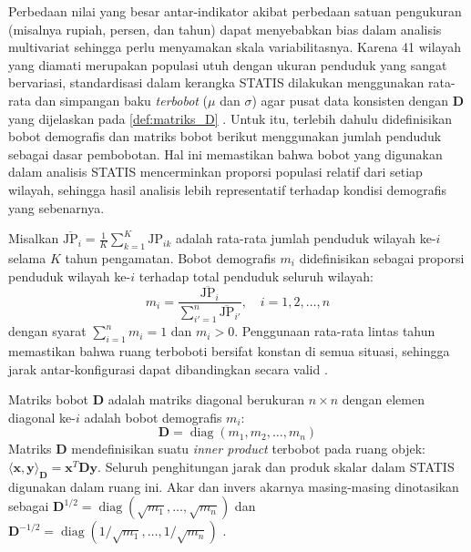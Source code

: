 Perbedaan nilai yang besar antar-indikator akibat perbedaan satuan pengukuran (misalnya rupiah, persen, dan tahun) dapat menyebabkan bias dalam analisis multivariat sehingga perlu menyamakan skala variabilitasnya. Karena 41 wilayah yang diamati merupakan populasi utuh dengan ukuran penduduk yang sangat bervariasi, standardisasi dalam kerangka STATIS dilakukan menggunakan rata-rata dan simpangan baku \textit{terbobot} ($\mu$ dan $\sigma$) agar pusat data konsisten dengan $\mathbf{D}$ yang dijelaskan pada \ref{def:matriks_D} \citep{lavit94}. Untuk itu, terlebih dahulu didefinisikan bobot demografis dan matriks bobot berikut menggunakan jumlah penduduk sebagai dasar pembobotan. Hal ini memastikan bahwa bobot yang digunakan dalam analisis STATIS mencerminkan proporsi populasi relatif dari setiap wilayah, sehingga hasil analisis lebih representatif terhadap kondisi demografis yang sebenarnya.

\begin{definition} \label{def:bobot}
  Misalkan $\overline{\mathrm{JP}}_i = \frac{1}{K}\sum_{k=1}^{K} \mathrm{JP}_{ik}$ adalah rata-rata jumlah penduduk wilayah ke-$i$ selama $K$ tahun pengamatan. Bobot demografis $m_i$ didefinisikan sebagai proporsi penduduk wilayah ke-$i$ terhadap total penduduk seluruh wilayah:
  \begin{equation} \label{eq:bobot}
    m_i = \frac{\overline{\mathrm{JP}}_i}{\displaystyle\sum_{i'=1}^{n} \overline{\mathrm{JP}}_{i'}}, \quad i = 1, 2, \ldots, n
  \end{equation}
  dengan syarat $\sum_{i=1}^{n} m_i = 1$ dan $m_i > 0$. Penggunaan rata-rata lintas tahun memastikan bahwa ruang terboboti bersifat konstan di semua situasi, sehingga jarak antar-konfigurasi dapat dibandingkan secara valid \citep{lavit94}.
\end{definition}

\begin{definition} \label{def:matriks_D}
  Matriks bobot $\mathbf{D}$ adalah matriks diagonal berukuran $n \times n$ dengan elemen diagonal ke-$i$ adalah bobot demografis $m_i$:
  \begin{equation} \label{eq:matriks_D}
    \mathbf{D} = \operatorname{diag}(m_1, m_2, \ldots, m_n)
  \end{equation}
  Matriks $\mathbf{D}$ mendefinisikan suatu \textit{inner product} terbobot pada ruang objek: $\langle \mathbf{x}, \mathbf{y} \rangle_{\mathbf{D}} = \mathbf{x}^T \mathbf{D} \mathbf{y}$. Seluruh penghitungan jarak dan produk skalar dalam STATIS digunakan dalam ruang ini. Akar dan invers akarnya masing-masing dinotasikan sebagai $\mathbf{D}^{1/2} = \operatorname{diag}(\sqrt{m_1}, \ldots, \sqrt{m_n})$ dan $\mathbf{D}^{-1/2} = \operatorname{diag}(1/\sqrt{m_1}, \ldots, 1/\sqrt{m_n})$ \citep{lavit94}.
\end{definition}

